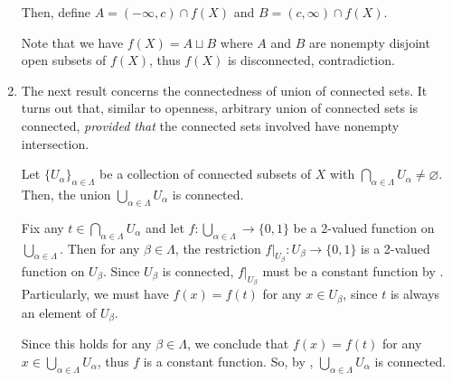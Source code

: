 \begin{enumerate}
\begin{pf}
Then, define \(A=(-\infty,c)\cap f(X)\) and \(B=(c,\infty)\cap f(X)\).
\begin{center}
\end{center}
Note that we have \(f(X)=A\sqcup B\) where \(A\) and \(B\) are nonempty
disjoint open subsets of \(f(X)\), thus \(f(X)\) is disconnected,
contradiction.
\end{pf}

\item The next result concerns the connectedness of union of connected sets. It
turns out that, similar to openness, arbitrary union of connected sets is
connected, \emph{provided that} the connected sets involved have nonempty
intersection.
\begin{proposition}
\label{prp:conn-union-nonemp-int-conn}
Let \(\{U_{\alpha}\}_{\alpha\in\Lambda}\) be a collection of connected
subsets of \(X\) with \(\displaystyle \bigcap_{\alpha\in\Lambda}U_{\alpha}\ne\varnothing\).
Then, the union \(\bigcup_{\alpha\in\Lambda}U_{\alpha}\) is connected.
\end{proposition}
\begin{pf}
Fix any \(t\in\bigcap_{\alpha\in\Lambda}U_{\alpha}\) and let
\(f:\bigcup_{\alpha\in\Lambda}\to\{0,1\}\) be a 2-valued function on
\(\bigcup_{\alpha\in\Lambda}\). Then for any \(\beta\in\Lambda\), the
restriction \(f|_{U_{\beta}}:U_{\beta}\to\{0,1\}\) is a 2-valued function on
\(U_{\beta}\). Since \(U_{\beta}\) is connected, \(f|_{U_{\beta}}\) must be a
constant function by . Particularly, we must have
\(f(x)=f(t)\) for any \(x\in U_{\beta}\), since \(t\) is always an element of
\(U_{\beta}\).

Since this holds for any \(\beta\in\Lambda\), we conclude that \(f(x)=f(t)\)
for any \(x\in\bigcup_{\alpha\in\Lambda}U_{\alpha}\), thus \(f\) is a constant
function. So, by , \(\bigcup_{\alpha\in\Lambda}U_{\alpha}\)
is connected.
\end{pf}


\end{enumerate}
